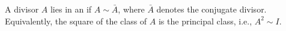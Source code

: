 A divisor $A$ lies in an  if $A \sim \bar{A}$, where $\bar{A}$ denotes the conjugate divisor. Equivalently, the square of the class of $A$ is the principal class, i.e., $A^2 \sim I$.
